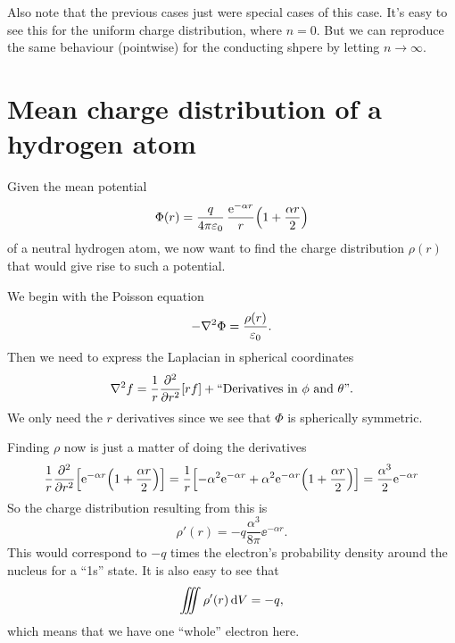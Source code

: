 \documentclass[11pt,letter, swedish, english
]{article}
\newcommand{\enaught}{\ensuremath\varepsilon_0}
\renewcommand{\thesubsection}{\arabic{section} (\alph{subsection})}
\begin{document}
Also note that the previous cases just were special cases of this
case. It's easy to see this for the uniform charge distribution, where
$n=0$. But we can reproduce the same behaviour (pointwise) for the
conducting shpere by letting $n\to\infty$.



\section{Mean charge distribution of a hydrogen atom}
\renewcommand{\thesubsection}{\arabic{section} (\alph{subsection})}
Given the mean potential 
\begin{equation}
\Phi(r)=\frac{q}{4\pi\enaught}\,\frac{\ee^{-\alpha r}}{r}
\qty(1+\frac{\alpha r}{2})
\end{equation}
of a neutral hydrogen atom, we now want to find the charge
distribution $\rho(r)$ that would give rise to such a potential.

We begin with the Poisson equation
\begin{equation}
-\laplacian\Phi=\frac{\rho(r)}{\enaught}.
\end{equation}
Then we need to express the Laplacian in spherical coordinates
\begin{equation}
\laplacian f = \frac{1}{r}\pdv[2]{r}[rf] + 
\text{``Derivatives in }\phi\text{ and }\theta\text{''}.
\end{equation}
We only need the $r$ derivatives since we see that $\Phi$ is
spherically symmetric. 

Finding $\rho$ now is just a matter of doing the derivatives
\begin{equation}
\frac{1}{r}\pdv[2]{r}\qty[\mathrm{e}^{-\alpha r}
\qty(1+\frac{\alpha r}{2})]
=\frac{1}{r} \qty[-\alpha^2\mathrm{e}^{-\alpha r} 
+\alpha^2\mathrm{e}^{-\alpha r}\qty(1+\frac{\alpha r}{2})]
=\frac{\alpha^3}{2}\mathrm{e}^{-\alpha r} 
\end{equation}
So the charge distribution resulting from
this is
\begin{equation}
\rho'(r)=-q\frac{\alpha^3}{8\pi}\ee^{-\alpha r}.
\end{equation}
This would correspond to $-q$ times the electron's probability density
around the nucleus for a ``1s'' state. It is also easy to see that 
\begin{equation}\label{eq:3_q'}
\iiint \rho'(r)\,\mathrm{d}{V}=-q,
\end{equation}
which means that we have one ``whole'' electron here.
\end{document}
